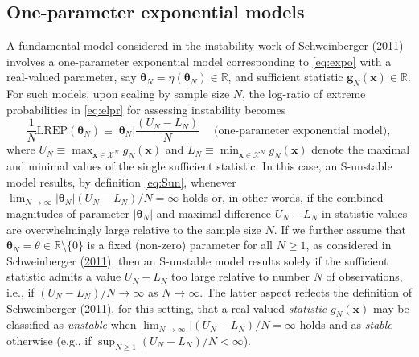 \documentclass[12pt]{article}
\theoremstyle{definition}
\newcommand{\REP}{\mathrm{LREP}}
\begin{document}
\subsection{One-parameter exponential models}\label{one-param-exp}

A fundamental model considered in the instability work of Schweinberger
(\protect\hyperlink{ref-schweinberger2011instability}{2011}) involves a
one-parameter exponential model corresponding to \eqref{eq:expo} with a
real-valued parameter, say
\(\boldsymbol \theta_N = \eta(\boldsymbol \theta_N)\in \mathbb{R}\), and
sufficient statistic \(\boldsymbol g_N(\boldsymbol x)\in \mathbb{R}\).
For such models, upon scaling by sample size \(N\), the log-ratio of
extreme probabilities in \eqref{eq:elpr} for assessing instability becomes
\begin{equation}
\label{eq:UL}
\frac{1}{N}\REP(\boldsymbol \theta_N ) \equiv   |\boldsymbol \theta_N| \frac{(U_N-L_N)}{N} \;\quad \mbox{(one-parameter exponential model)},
\end{equation}
where
\(U_N \equiv \max_{\boldsymbol x\in\mathcal{X}^N}g_N(\boldsymbol x)\)
and
\(L_N \equiv \min_{\boldsymbol x\in\mathcal{X}^N}g_N(\boldsymbol x)\)
denote the maximal and minimal values of the single sufficient
statistic. In this case, an S-unstable model results, by definition
\eqref{eq:Sun}, whenever
\(\lim_{N\to \infty} |\boldsymbol \theta_N| (U_N-L_N)/N= \infty\) holds
or, in other words, if the combined magnitudes of parameter
\(|\boldsymbol \theta_N|\) and maximal difference \(U_N-L_N\) in
statistic values are overwhelmingly large relative to the sample size
\(N\). If we further assume that
\(\boldsymbol \theta_N =\theta\in\mathbb{R}\setminus \{0\}\) is a fixed
(non-zero) parameter for all \(N \geq 1\), as considered in
Schweinberger
(\protect\hyperlink{ref-schweinberger2011instability}{2011}), then an
S-unstable model results solely if the sufficient statistic admits a
value \(U_N-L_N\) too large relative to number \(N\) of observations,
i.e., if \((U_N-L_N)/N\to \infty\) as \(N\to \infty\). The latter aspect
reflects the definition of Schweinberger
(\protect\hyperlink{ref-schweinberger2011instability}{2011}), for this
setting, that a real-valued \emph{statistic} \(g_N(\boldsymbol x)\) may
be classified as \emph{unstable} when
\(\lim_{N\to \infty}|(U_N-L_N)/N=\infty\) holds and as \emph{stable}
otherwise (e.g., if \(\sup_{N \geq 1}(U_N-L_N)/N<\infty\)).
\end{document}
